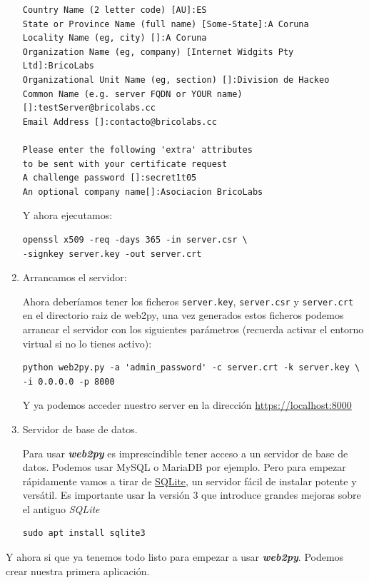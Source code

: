 \documentclass[
  12pt,
  spanish,
]{article}
\begin{document}
\begin{enumerate}
\begin{verbatim}
Country Name (2 letter code) [AU]:ES
State or Province Name (full name) [Some-State]:A Coruna
Locality Name (eg, city) []:A Coruna
Organization Name (eg, company) [Internet Widgits Pty Ltd]:BricoLabs
Organizational Unit Name (eg, section) []:Division de Hackeo
Common Name (e.g. server FQDN or YOUR name) []:testServer@bricolabs.cc
Email Address []:contacto@bricolabs.cc

Please enter the following 'extra' attributes
to be sent with your certificate request
A challenge password []:secret1t05
An optional company name[]:Asociacion BricoLabs
\end{verbatim}

  Y ahora ejecutamos:

\begin{verbatim}
openssl x509 -req -days 365 -in server.csr \
-signkey server.key -out server.crt
\end{verbatim}
\item
  Arrancamos el servidor:

  Ahora deberíamos tener los ficheros \texttt{server.key},
  \texttt{server.csr} y \texttt{server.crt} en el directorio raiz de
  web2py, una vez generados estos ficheros podemos arrancar el servidor
  con los siguientes parámetros (recuerda activar el entorno virtual si
  no lo tienes activo):

\begin{verbatim}
python web2py.py -a 'admin_password' -c server.crt -k server.key \
-i 0.0.0.0 -p 8000
\end{verbatim}

  Y ya podemos acceder nuestro server en la dirección
  \url{https://localhost:8000}
\item
  Servidor de base de datos.

  Para usar \textbf{\emph{web2py}} es imprescindible tener acceso a un
  servidor de base de datos. Podemos usar MySQL o MariaDB por ejemplo.
  Pero para empezar rápidamente vamos a tirar de
  \href{https://www.sqlite.org/version3.html}{SQLite}, un servidor fácil
  de instalar potente y versátil. Es importante usar la versión 3 que
  introduce grandes mejoras sobre el antiguo \emph{SQLite}

\begin{verbatim}
sudo apt install sqlite3
\end{verbatim}
\end{enumerate}

Y ahora si que ya tenemos todo listo para empezar a usar
\textbf{\emph{web2py}}. Podemos crear nuestra primera aplicación.
\end{document}
